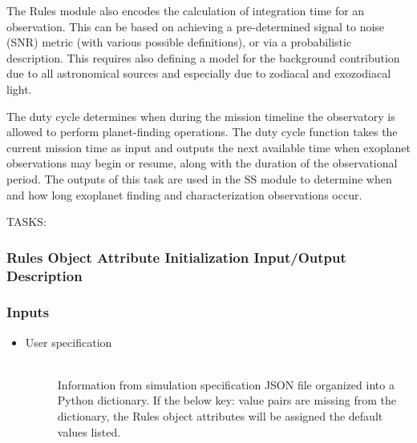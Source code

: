 \documentclass[cleanfoot]{asme2ej}
\begin{document}
The Rules module also encodes the calculation of integration time for an observation.  This can be based on achieving a pre-determined signal to noise (SNR) metric (with various possible definitions), or via a probabilistic description.  This requires also defining a model for the background contribution due to all astronomical sources and especially due to zodiacal and exozodiacal light.

The duty cycle determines when during the mission timeline the observatory is allowed to perform planet-finding operations.  The duty cycle function takes the current mission time as input and outputs the next available time when exoplanet observations may begin or resume, along with the duration of the observational period. The outputs of this task are used in the SS module to determine when and how long exoplanet finding and characterization observations occur.  

TASKS:

\label{sec:rules}
\subsubsection{Rules Object Attribute Initialization Input/Output Description}

\subsubsection*{Inputs}
\begin{itemize}
    \item
    \begin{description}
        \item[User specification] \hfill \\
        Information from simulation specification JSON file organized into a Python dictionary. If the below key: value pairs are missing from the dictionary, the Rules object attributes will be assigned the default values listed.
    \end{description}
\end{itemize}
\end{document}
